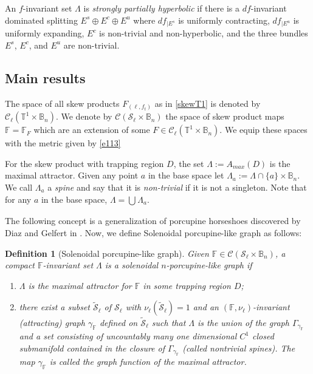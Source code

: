 \documentclass[11pt,reqno]{amsart}
\theoremstyle{plain}
\newtheorem{definition}[theorem]{Definition}
\newtheorem{remark}[theorem]{Remark}
\newtheorem*{theorem A}{Theorem A}
\newtheorem*{theorem B}{Theorem B}
\newtheorem*{theorem C}{Theorem C}
\newtheorem*{theorem 1}{Theorem 1}
\newtheorem*{theorem 2}{Theorem 2}
\newtheorem*{theorem 3}{Theorem 3}
\numberwithin{equation}{section}
\begin{document}
An $f$-invariant set $\Lambda$ is \emph{strongly partially hyperbolic} if there is a $df$-invariant dominated splitting
$E^s \oplus E^c \oplus E^u$ where $df_{|E^s}$ is uniformly contracting, $df_{|E^u}$ is uniformly
expanding, $E^c$ is non-trivial and non-hyperbolic, and the three bundles $E^s$, $E^c$, and $E^u$ are non-trivial.

\subsection{Main results}\label{mm}
The space of all skew products $F_{(\ell, f_t)}$
as in \eqref{skewT1} is denoted by $\mathcal{C}_\ell(\mathbb{T}^1\times \mathbb{B}_n)$.
We denote by $\mathcal{C} (\mathcal{S}_\ell \times \mathbb{B}_n)$
the space of skew product maps $\mathbb{F}= \mathbb{F}_{F}$
which are an extension of some
$F\in \mathcal{C}_\ell(\mathbb{T}^1\times \mathbb{B}_n)$.
We equip these spaces with the metric given by \eqref{e113}

For the skew product with trapping region $D$, the set $\Lambda:=A_{max}(D)$ is the maximal attractor. 
Given any point $a$ in the base space let $\Lambda_a:=\Lambda \cap \{a\}\times \mathbb{B}_n$. We call $\Lambda_a$ a \emph{spine} and say that it is \emph{non-trivial} if it is not a singleton.
Note that for any $a$ in the base space, $\Lambda=\bigcup_{}\Lambda_a$.

The following concept is a generalization of porcupine horseshoes discovered by Diaz and Gelfert in \cite{diaz2010porcupine}.
Now, we define Solenoidal porcupine-like graph as follows:

\begin{definition}[Solenoidal porcupine-like graph]\label{sol}
Given $\mathbb{F} \in \mathcal{C}(\mathcal{S}_\ell \times \mathbb{B}_n)$,
a compact $\mathbb{F}$-invariant set $\Lambda$ is
a {\em{solenoidal $n$-porcupine-like graph}} if
\begin{enumerate}
  \item [(1)] $\Lambda$ is the maximal attractor for $\mathbb{F}$ in some trapping region $D$;
  \item [(2)]   there exist a subset $\widetilde{\mathcal{S}}_\ell$ of $\mathcal{S}_\ell$ with
  $\nu_\ell(\widetilde{\mathcal{S}}_\ell)=1$
    and an $(\mathbb{F},\nu_\ell)$-invariant (attracting) graph $\gamma_{\mathbb{F}}$
    defined on   $\widetilde{\mathcal{S}}_\ell$
     such that
  $\Lambda$ is the union of  the graph $\Gamma_{\gamma_{\mathbb{F}}}$  and a set
  consisting
of uncountably many one dimensional $C^1$ closed submanifold
contained in the closure of $\Gamma_{\gamma_{\mathbb{F}}}$ (called {\em{nontrivial spines}}).
The map $\gamma_{\mathbb{F}}$ is called  the {\em{graph function of the maximal attractor.}}
  \end{enumerate}
  \end{definition}
\end{document}

